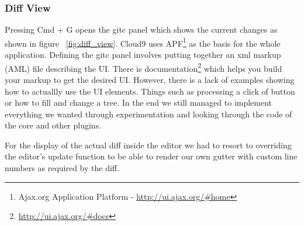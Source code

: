\subsubsection{Diff View}

Pressing Cmd + G opens the gitc panel which shows the current changes as shown in figure ~\ref{fig:diff_view}.
Cloud9 uses APF\footnote{Ajax.org Application Platform - \url{http://ui.ajax.org/#home}} as the basis for the whole application.
Defining the gitc panel involves putting together an xml markup (AML) file describing the UI.
There is documentation\footnote{\url{http://ui.ajax.org/#docs}} which helps you build your markup to get the desired UI.
However, there is a lack of examples showing how to actuallly use the UI elements. Things such as processing a click of button
or how to fill and change a tree.
In the end we still managed to implement everything we wanted through experimentation and looking through the code of the core
and other plugins.

For the display of the actual diff inside the editor we had to resort to overriding the editor's update function to be able to
render our own gutter with custom line numbers as required by the diff.
